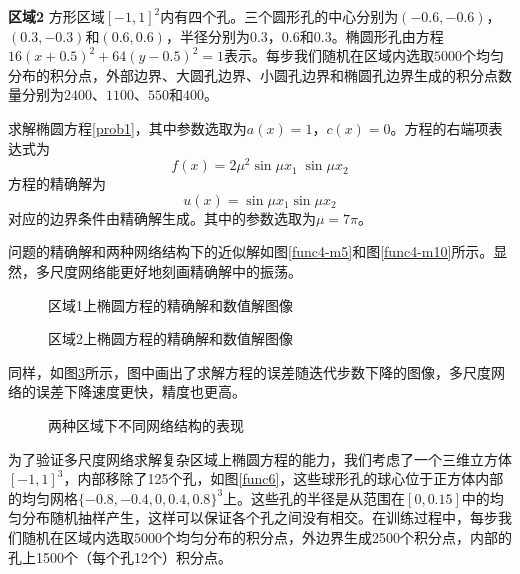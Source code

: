 {\bf 区域2} 方形区域$[-1, 1]^2$内有四个孔。三个圆形孔的中心分别为$(-0.6,-0.6)$，$(0.3,-0.3)$和$(0.6,0.6)$，半径分别为$0.3$，$0.6$和$0.3$。椭圆形孔由方程$16(x+0.5)^2+64(y-0.5)^2=1$表示。每步我们随机在区域内选取$5000$个均匀分布的积分点，外部边界、大圆孔边界、小圆孔边界和椭圆孔边界生成的积分点数量分别为$2400$、$1100$、$550$和$400$。

求解椭圆方程\ref{prob1}，其中参数选取为$a(x)=1$，$c(x)=0$。方程的右端项表达式为
\begin{equation}
f(x) = 2 \mu^2 \sin \mu x_1 \; \sin \mu x_2
\end{equation}
方程的精确解为
\begin{equation}
u(x) = \sin \mu x_1 \sin \mu x_2
\end{equation}
对应的边界条件由精确解生成。其中的参数选取为$\mu = 7 \pi$。

问题的精确解和两种网络结构下的近似解如图\ref{func4-m5}和图\ref{func4-m10}所示。显然，多尺度网络能更好地刻画精确解中的振荡。

\begin{figure}[htbp]
\centering
{}
\caption{区域1上椭圆方程的精确解和数值解图像}
\label{func5-r1}
\end{figure}

\begin{figure}[htbp]
\centering
{}
\caption{区域2上椭圆方程的精确解和数值解图像}
\label{func5-r2}
\end{figure}

同样，如图\ref{e7}所示，图中画出了求解方程的误差随迭代步数下降的图像，多尺度网络的误差下降速度更快，精度也更高。

\begin{figure}[htbp]
\centering
{}
\caption{两种区域下不同网络结构的表现}
\label{e7}
\end{figure}


为了验证多尺度网络求解复杂区域上椭圆方程的能力，我们考虑了一个三维立方体$[-1,1]^3$，内部移除了125个孔，如图\ref{func6}，这些球形孔的球心位于正方体内部的均匀网格$\{-0.8, -0.4, 0, 0.4, 0.8\}^3$上。这些孔的半径是从范围在$[0, 0.15]$中的均匀分布随机抽样产生，这样可以保证各个孔之间没有相交。在训练过程中，每步我们随机在区域内选取$5000$个均匀分布的积分点，外边界生成2500个积分点，内部的孔上1500个（每个孔12个）积分点。

